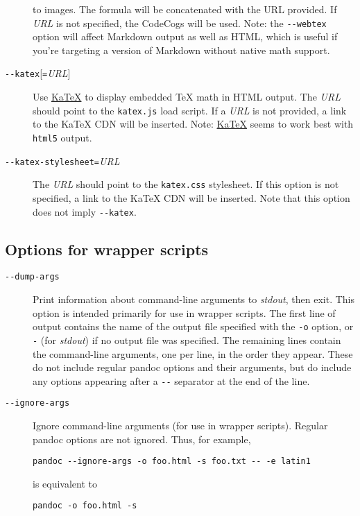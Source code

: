 \documentclass[]{article}
\begin{document}
\begin{description}
to images. The formula will be concatenated with the URL provided. If
\emph{URL} is not specified, the CodeCogs will be used. Note: the
\texttt{-\/-webtex} option will affect Markdown output as well as HTML,
which is useful if you're targeting a version of Markdown without native
math support.
\item[\texttt{-\/-katex}{[}\texttt{=}\emph{URL}{]}]
Use \href{https://github.com/Khan/KaTeX}{KaTeX} to display embedded TeX
math in HTML output. The \emph{URL} should point to the
\texttt{katex.js} load script. If a \emph{URL} is not provided, a link
to the KaTeX CDN will be inserted. Note:
\href{https://github.com/Khan/KaTeX}{KaTeX} seems to work best with
\texttt{html5} output.
\item[\texttt{-\/-katex-stylesheet=}\emph{URL}]
The \emph{URL} should point to the \texttt{katex.css} stylesheet. If
this option is not specified, a link to the KaTeX CDN will be inserted.
Note that this option does not imply \texttt{-\/-katex}.
\end{description}

\subsection{Options for wrapper
scripts}\label{options-for-wrapper-scripts}

\begin{description}
\item[\texttt{-\/-dump-args}]
Print information about command-line arguments to \emph{stdout}, then
exit. This option is intended primarily for use in wrapper scripts. The
first line of output contains the name of the output file specified with
the \texttt{-o} option, or \texttt{-} (for \emph{stdout}) if no output
file was specified. The remaining lines contain the command-line
arguments, one per line, in the order they appear. These do not include
regular pandoc options and their arguments, but do include any options
appearing after a \texttt{-\/-} separator at the end of the line.
\item[\texttt{-\/-ignore-args}]
Ignore command-line arguments (for use in wrapper scripts). Regular
pandoc options are not ignored. Thus, for example,

\begin{verbatim}
pandoc --ignore-args -o foo.html -s foo.txt -- -e latin1
\end{verbatim}

is equivalent to

\begin{verbatim}
pandoc -o foo.html -s
\end{verbatim}
\end{description}
\end{document}
